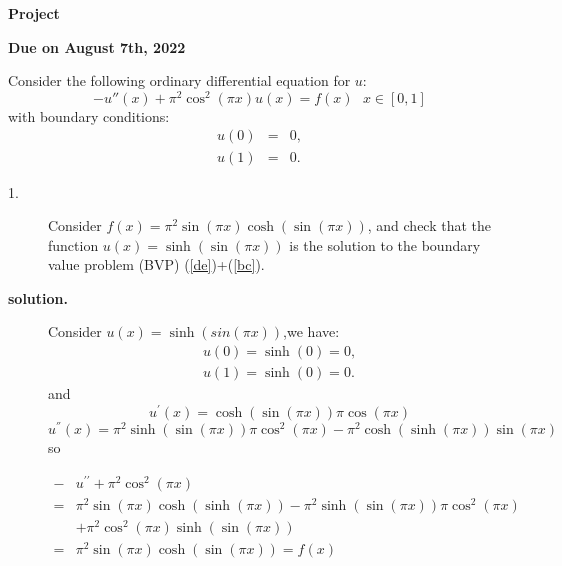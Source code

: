 \documentclass[12pt]{article}
\begin{document}
\thispagestyle{plain}
\begin{center}
{\Large \bf Project}

\medskip
{\bf Due on August 7th, 2022}
\end{center}
\noindent
Consider the following ordinary
differential equation for $u$:
\begin{equation}
\label{de}
-u''(x)+\pi^2 \cos^2(\pi x) u(x) = f(x)\ \ \ x \in [0,1]
\end{equation}
with boundary conditions:
\begin{eqnarray}
\label{bc}
u(0) &=& 0, \nonumber \\
u(1) &=& 0.
\end{eqnarray}
\begin{description}
\item[1.] Consider
$f(x) = \pi^2 \sin(\pi x) \cosh(\sin (\pi x) )$,
and check that the function $u(x) = \sinh ( \sin (\pi x) )$ is the
solution to the
boundary value problem (BVP) (\ref{de})+(\ref{bc}).

\item[\textbf{solution.}]
Consider $u(x)=\sinh(sin (\pi x) )$,we have:
\begin{eqnarray}
    u(0)=\sinh(0)=0,\nonumber\\
    u(1)=\sinh(0)=0.
\end{eqnarray}
and
\begin{equation}
    u^{'}(x)=\cosh(\sin (\pi x) )\pi \cos (\pi x)
\end{equation}
\begin{equation}
    u^{''}(x)=\pi^{2}\sinh(\sin (\pi x) )\pi \cos^{2} (\pi x)-\pi^{2}\cosh(\sinh(\pi x))\sin(\pi x)
\end{equation}
so

\begin{equation}
    \begin{aligned}
    -& u^{\prime \prime}+\pi^{2} \cos ^{2}(\pi x)  \\
    =& \pi^{2} \sin (\pi x) \cosh (\sinh (\pi x))-\pi^{2} \sinh (\sin (\pi x)) \pi \cos ^{2}(\pi x)  \\
    &+\pi^{2} \cos ^{2}(\pi x) \sinh (\sin (\pi x))  \\
    =& \pi^{2} \sin (\pi x) \cosh (\sin (\pi x))=f(x)
    \end{aligned}
    \end{equation}



\end{description}
\end{document}
